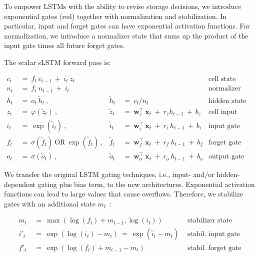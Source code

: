 To empower LSTMs with the ability to revise storage decisions, we introduce exponential gates (red) together with normalization and stabilization. In particular, input and forget gates can have exponential activation functions. For normalization, we introduce a normalizer state that sums up the product of the input gate times all future forget gates.

The scalar sLSTM forward pass is:

\begin{align}
\label{eq:slstmforward}
c_t \ &= \  f_t \ c_{t-1} \ + \ i_t \ z_t & & 
 &\text{cell state} \\
n_t \ &= \  f_t \ n_{t-1} \ + \ i_t  & & 
 &\text{normalizer state} \\
h_t \ &= \ o_t \ \tilde{h}_t \ ,
  &\tilde{h}_t \ &= \ c_t / n_t
&\text{hidden state} \\
z_t \ &= \ \varphi \left( \tilde{z}_t \right) \ , 
  &\tilde{z}_t \ &=  \ \mathbf{w}^\top_{z} \ \mathbf{x}_t \ + \
  r_{z}  h_{t-1} \ + \  b_{z}
  &\text{cell input} \\
i_t \ &= \ \!\exp \left( \tilde{i}_t  \right) \ , 
  &\tilde{i}_t \ &= \ \mathbf{w}^\top_{i} \ \mathbf{x}_t \ + \
  r_{i}  \ h_{t-1} \ + \  b_{i}
  &\text{input gate} \\
f_t \ &= \ \sigma \left(  \tilde{f}_t \right) \ \text{OR} \
\!\exp \left(  \tilde{f}_t \right) \ ,
  &\tilde{f}_t \ &= \ \mathbf{w}^\top_{f} \ \mathbf{x}_t  \ + \
  r_{f}  \ h_{t-1} \ + \  b_{f}
  &\text{forget gate} \\
o_t \ &= \ \sigma \left( \tilde{o}_t \right) \ , 
  &\tilde{o}_t  \ &= \ \mathbf{w}^\top_{o} \ \mathbf{x}_t \ + \
  r_{o}  \ h_{t-1} \ + \  b_{o}
  &\text{output gate} 
\end{align}

We transfer the original LSTM gating techniques, i.e., input- and/or hidden-dependent gating plus bias term, to the new architectures. Exponential activation functions can lead to large values that cause overflows. Therefore, we stabilize gates with an additional state \mbox{$m_t$~\citep{Milakov:18arxiv}}:

\begin{align}
\label{eq:slstmstabil}
m_t \ &= \ \max \left( \log ( f_t ) + m_{t-1} , \log ( i_t ) \right) &\text{stabilizer state} \\
i'_t \ &= \ \!\exp \left( \log \left ( i_t \right) - m_t \right) \ = \ \!\exp \left( \tilde{i}_t - m_t \right) \ \, 
  &\text{stabil. input gate} \\
f'_t \ &= \ \!\exp \left( \log \left( f_t \right) + m_{t-1} - m_t \right) \ \, 
  &\text{stabil. forget gate}
\end{align}

